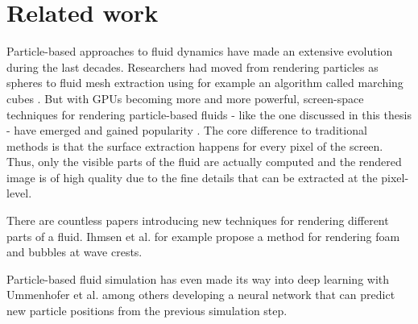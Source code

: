 %
\chapter{Related work}
\label{sec:related}

Particle-based approaches to fluid dynamics have made an extensive evolution during the last decades. Researchers had moved from rendering particles as spheres to fluid mesh extraction using for example an algorithm called marching cubes \cite{Muller:2003, Williams:2008, Yu:2013}. But with GPUs becoming more and more powerful, screen-space techniques for rendering particle-based fluids - like the one discussed in this thesis - have emerged and gained popularity \cite{Wu:2022, VanDerLaan:2009}. The core difference to traditional methods is that the surface extraction happens for every pixel of the screen. Thus, only the visible parts of the fluid are actually computed and the rendered image is of high quality due to the fine details that can be extracted at the pixel-level.

There are countless papers introducing new techniques for rendering different parts of a fluid. Ihmsen et al. \cite{Ihmsen:2012} for example propose a method for rendering foam and bubbles at wave crests.

Particle-based fluid simulation has even made its way into deep learning with Ummenhofer et al. \cite{Ummenhofer:2020} among others developing a neural network that can predict new particle positions from the previous simulation step.
